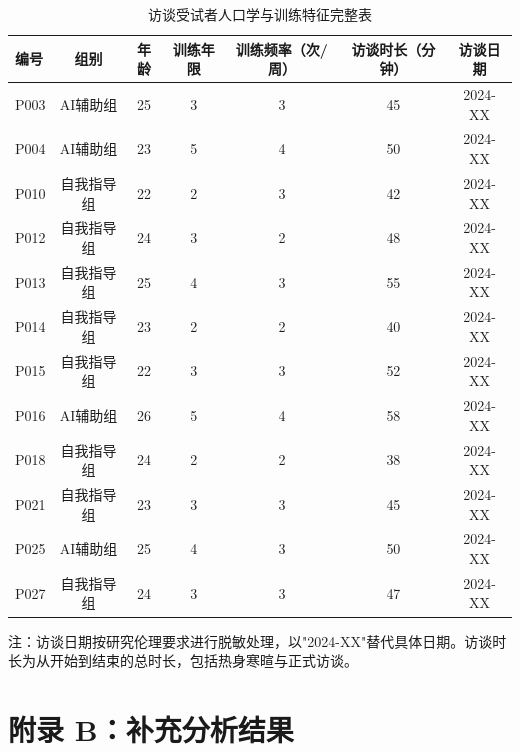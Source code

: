 \begin{landscape}
\thispagestyle{empty}
\begin{table}[htbp]
\centering
\caption{访谈受试者人口学与训练特征完整表}
\label{tab:app_interview_full}
\begin{threeparttable}
\begin{tabular}{lcccccc}
\toprule
编号 & 组别 & 年龄 & 训练年限 & 训练频率（次/周） & 访谈时长（分钟） & 访谈日期 \\
\midrule
P003 & AI辅助组 & 25 & 3 & 3 & 45 & 2024-XX \\
P004 & AI辅助组 & 23 & 5 & 4 & 50 & 2024-XX \\
P010 & 自我指导组 & 22 & 2 & 3 & 42 & 2024-XX \\
P012 & 自我指导组 & 24 & 3 & 2 & 48 & 2024-XX \\
P013 & 自我指导组 & 25 & 4 & 3 & 55 & 2024-XX \\
P014 & 自我指导组 & 23 & 2 & 2 & 40 & 2024-XX \\
P015 & 自我指导组 & 22 & 3 & 3 & 52 & 2024-XX \\
P016 & AI辅助组 & 26 & 5 & 4 & 58 & 2024-XX \\
P018 & 自我指导组 & 24 & 2 & 2 & 38 & 2024-XX \\
P021 & 自我指导组 & 23 & 3 & 3 & 45 & 2024-XX \\
P025 & AI辅助组 & 25 & 4 & 3 & 50 & 2024-XX \\
P027 & 自我指导组 & 24 & 3 & 3 & 47 & 2024-XX \\
\bottomrule
\end{tabular}
\begin{tablenotes}[flushleft]\footnotesize
\item 注：访谈日期按研究伦理要求进行脱敏处理，以"2024-XX"替代具体日期。访谈时长为从开始到结束的总时长，包括热身寒暄与正式访谈。
\end{tablenotes}
\end{threeparttable}
\end{table}
\end{landscape}

\section*{附录 B：补充分析结果}

